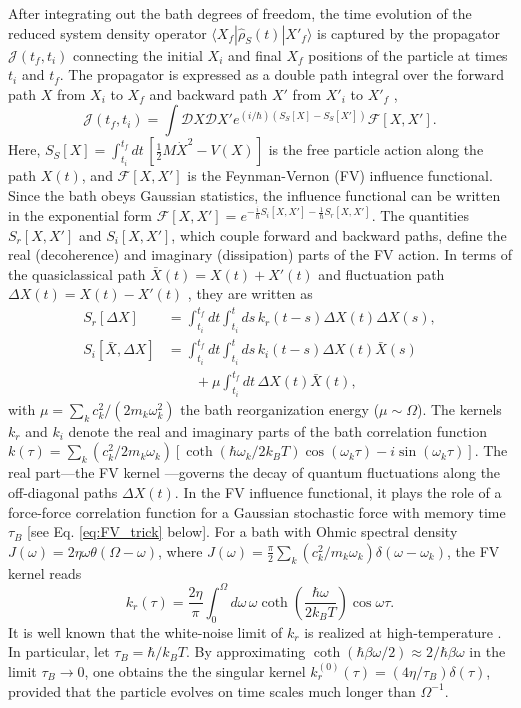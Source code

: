 \documentclass[prl,twocolumn,superscriptaddress,amsmath,amssymb]{revtex4-2}
\def\be{\begin{equation}}
\def\ee{\end{equation}}
\newcommand{\hb}{\hbar}
\begin{document}
After integrating out the bath degrees of freedom, the time evolution of the reduced system density operator $\langle X_f|\hat{\rho}_S(t)|X'_f\rangle$ is captured by the propagator $\mathcal{J}(t_f,t_i)$ connecting the initial $X_i$ and final $X_f$ positions of the particle at times $t_i$ and $t_f$. The propagator is expressed as a double path integral over the forward path $X$ from $X_i$ to $X_f$ and backward path $X'$ from $X'_i$ to $X'_f$ \cite{Weiss2011},  
\be
\label{eq:FV-Weiss}
    \mathcal{J}(t_f,t_i) = \int\mathcal{D}X\mathcal{D}X'e^{(i/\hb)(S_S[X] - S_S[X'])}\mathcal{F}[X,X'].
\ee
Here, $S_S[X]=\int^{t_f}_{t_i}dt\,[\frac{1}{2}M\dot{X}^2-V(X)]$ is the free particle action along the path $X(t)$, and $\mathcal{F}[X,X']$ is the Feynman-Vernon (FV) influence functional. Since the bath obeys Gaussian statistics, the influence functional can be written in the exponential form $\mathcal{F}[X,X']= e^{-\frac{i}{\hb}S_i[X,X']-\frac{1}{\hb}S_r[X,X']}$. The quantities $S_r[X,X']$ and $S_i[X,X']$, which couple forward and backward paths, define the real (decoherence) and imaginary (dissipation) parts of the FV action. In terms of the quasiclassical path $\bar{X}(t)=X(t)+X'(t)$ and fluctuation path $\Delta X(t)=X(t)-X'(t)$ \cite{Weiss2011}, they are written as
\begin{align}
S_r[\Delta X] &= \int^{t_f}_{t_i}dt\int^{t}_{t_i}ds\,k_r(t-s)\Delta X(t)\Delta X(s),\label{eq:noise_action} \\
S_i[\bar{X},\Delta X] &= \int^{t_f}_{t_i}dt\int^{t}_{t_i}ds\,k_i(t-s)\Delta{X}(t)\bar{X}(s)\nonumber\\
&\qquad + \mu\int^{t_f}_{t_i}dt\,\Delta X(t)\bar{X}(t),
\end{align}
with $\mu = \sum_kc^2_k/(2m_k\omega^2_k)$ the bath reorganization energy ($\mu\sim\Omega$). The kernels $k_r$ and $k_i$ denote the real and imaginary parts of the bath correlation function $k(\tau)=\sum_k(c^2_k/2m_k\omega_k)[\coth(\hb\omega_k/2k_BT)\cos{(\omega_k\tau)} - i\sin{(\omega_k\tau)}]$. The real part---the FV kernel \cite{FeynmanVernon}---governs the decay of quantum fluctuations along the off-diagonal paths $\Delta X(t)$. In the FV influence functional, it plays the role of a force-force correlation function for a Gaussian stochastic force with memory time $\tau_B$ [see Eq. \eqref{eq:FV_trick} below]. For a bath with Ohmic spectral density $J(\omega)=2\eta\omega\theta(\Omega-\omega)$, where $J(\omega) = \frac{\pi}{2}\sum_k(c^2_k/m_k\omega_k)\delta(\omega-\omega_k)$, the FV kernel reads
\be\label{eq:FV}
    k_r(\tau) = \frac{2\eta}{\pi}\int^{\Omega}_0d\omega\,\omega\coth{\left(\frac{\hb\omega}{2k_BT}\right)}\cos{\omega\tau}.
\ee
It is well known that the white-noise limit of $k_r$ is realized at high-temperature \cite{CaldeiraLeggettA}. In particular, let $\tau_B=\hb/k_BT$. By approximating $\coth{(\hb\beta\omega/2)}\approx 2/\hb\beta\omega$ in the limit $\tau_B\rightarrow 0$, one obtains the the singular kernel $k^{(0)}_r(\tau)=(4\eta/\tau_B)\delta(\tau)$, provided that the particle evolves on time scales much longer than $\Omega^{-1}$. 
\end{document}

